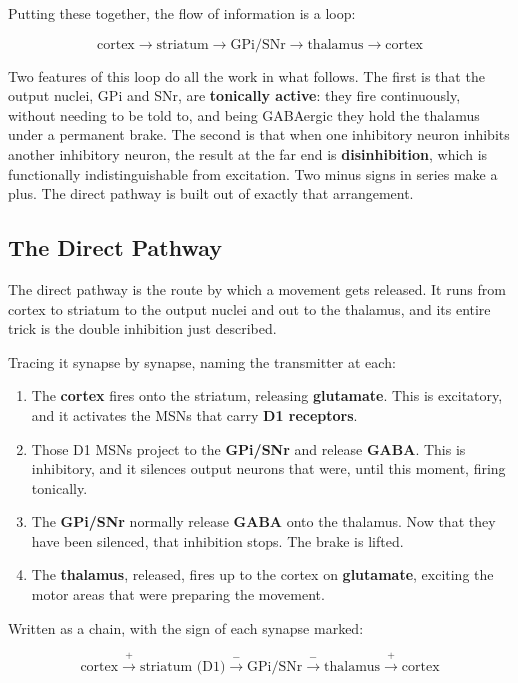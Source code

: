 \documentclass[11pt]{article}
\begin{document}
Putting these together, the flow of information is a loop:

\[
\text{cortex} \rightarrow \text{striatum} \rightarrow \text{GPi/SNr} \rightarrow \text{thalamus} \rightarrow \text{cortex}
\]

Two features of this loop do all the work in what follows. The first is that the output nuclei, GPi and SNr, are \textbf{tonically active}: they fire continuously, without needing to be told to, and being GABAergic they hold the thalamus under a permanent brake. The second is that when one inhibitory neuron inhibits another inhibitory neuron, the result at the far end is \textbf{disinhibition}, which is functionally indistinguishable from excitation. Two minus signs in series make a plus. The direct pathway is built out of exactly that arrangement.

\subsection{The Direct Pathway}

The direct pathway is the route by which a movement gets released. It runs from cortex to striatum to the output nuclei and out to the thalamus, and its entire trick is the double inhibition just described.

Tracing it synapse by synapse, naming the transmitter at each:

\begin{enumerate}
    \item The \textbf{cortex} fires onto the striatum, releasing \textbf{glutamate}. This is excitatory, and it activates the MSNs that carry \textbf{D1 receptors}.
    \item Those D1 MSNs project to the \textbf{GPi/SNr} and release \textbf{GABA}. This is inhibitory, and it silences output neurons that were, until this moment, firing tonically.
    \item The \textbf{GPi/SNr} normally release \textbf{GABA} onto the thalamus. Now that they have been silenced, that inhibition stops. The brake is lifted.
    \item The \textbf{thalamus}, released, fires up to the cortex on \textbf{glutamate}, exciting the motor areas that were preparing the movement.
\end{enumerate}

Written as a chain, with the sign of each synapse marked:

\[
\text{cortex} \xrightarrow{\;+\;} \text{striatum (D1)} \xrightarrow{\;-\;} \text{GPi/SNr} \xrightarrow{\;-\;} \text{thalamus} \xrightarrow{\;+\;} \text{cortex}
\]
\end{document}
